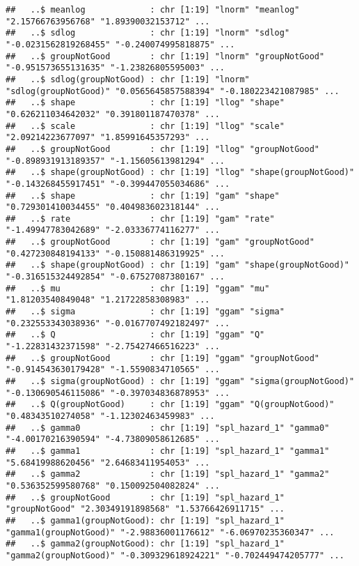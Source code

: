 \documentclass[
]{article}
\begin{document}
\begin{verbatim}
##   ..$ meanlog             : chr [1:19] "lnorm" "meanlog" "2.15766763956768" "1.89390032153712" ...
##   ..$ sdlog               : chr [1:19] "lnorm" "sdlog" "-0.0231562819268455" "-0.240074995818875" ...
##   ..$ groupNotGood        : chr [1:19] "lnorm" "groupNotGood" "-0.951573655131635" "-1.23826805595003" ...
##   ..$ sdlog(groupNotGood) : chr [1:19] "lnorm" "sdlog(groupNotGood)" "0.0565645857588394" "-0.180223421087985" ...
##   ..$ shape               : chr [1:19] "llog" "shape" "0.626211034642032" "0.391801187470378" ...
##   ..$ scale               : chr [1:19] "llog" "scale" "2.09214223677097" "1.85991645357293" ...
##   ..$ groupNotGood        : chr [1:19] "llog" "groupNotGood" "-0.898931913189357" "-1.15605613981294" ...
##   ..$ shape(groupNotGood) : chr [1:19] "llog" "shape(groupNotGood)" "-0.143268455917451" "-0.399447055034686" ...
##   ..$ shape               : chr [1:19] "gam" "shape" "0.729301410034455" "0.404983602318144" ...
##   ..$ rate                : chr [1:19] "gam" "rate" "-1.49947783042689" "-2.03336774116277" ...
##   ..$ groupNotGood        : chr [1:19] "gam" "groupNotGood" "0.427230848194133" "-0.150881486319925" ...
##   ..$ shape(groupNotGood) : chr [1:19] "gam" "shape(groupNotGood)" "-0.316515324492854" "-0.67527087380167" ...
##   ..$ mu                  : chr [1:19] "ggam" "mu" "1.81203540849048" "1.21722858308983" ...
##   ..$ sigma               : chr [1:19] "ggam" "sigma" "0.232553343038936" "-0.0167707492182497" ...
##   ..$ Q                   : chr [1:19] "ggam" "Q" "-1.22831432371598" "-2.75427466516223" ...
##   ..$ groupNotGood        : chr [1:19] "ggam" "groupNotGood" "-0.914543630179428" "-1.5590834710565" ...
##   ..$ sigma(groupNotGood) : chr [1:19] "ggam" "sigma(groupNotGood)" "-0.130690546115086" "-0.397034836878953" ...
##   ..$ Q(groupNotGood)     : chr [1:19] "ggam" "Q(groupNotGood)" "0.48343510274058" "-1.12302463459983" ...
##   ..$ gamma0              : chr [1:19] "spl_hazard_1" "gamma0" "-4.00170216390594" "-4.73809058612685" ...
##   ..$ gamma1              : chr [1:19] "spl_hazard_1" "gamma1" "5.68419988620456" "2.64683411954053" ...
##   ..$ gamma2              : chr [1:19] "spl_hazard_1" "gamma2" "0.536352599580768" "0.150092504082824" ...
##   ..$ groupNotGood        : chr [1:19] "spl_hazard_1" "groupNotGood" "2.30349191898568" "1.53766426911715" ...
##   ..$ gamma1(groupNotGood): chr [1:19] "spl_hazard_1" "gamma1(groupNotGood)" "-2.98836001176612" "-6.06970235360347" ...
##   ..$ gamma2(groupNotGood): chr [1:19] "spl_hazard_1" "gamma2(groupNotGood)" "-0.309329618924221" "-0.702449474205777" ...

\end{verbatim}
\end{document}
